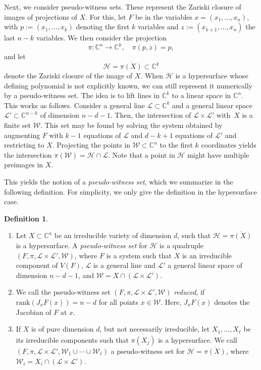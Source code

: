 \documentclass[11pt]{article}
\numberwithin{equation}{section}
\theoremstyle{plain}
\theoremstyle{definition}
\newtheorem{definition}[theorem]{Definition}
\theoremstyle{remark}
\newcommand{\sH}{{\mathcal H}}
\newcommand\bC{{\mathbb C}}
\begin{document}
Next, we consider pseudo-witness sets. These represent the Zariski closure of images of projections of $X$. For this, let $F$ be in the variables $x=(x_{1},\dots, x_{n})$, with $p:=(x_{1},\dots, x_{k})$ denoting the first $k$ variables and $z:=(x_{k+1},\ldots,x_n)$ the last $n-k$ variables. We then consider the projection
\begin{equation}\label{projection}
    \pi \colon \bC^{n} \to \bC^{k}, \quad \pi(p,z) = p,
\end{equation}
and let 
\begin{equation}\label{def_H_formal}\sH = \overline{\pi(X)}\subset \bC^{k}\end{equation}
denote the Zariski closure of the image of $X$. 
When $\sH$ is a hypersurface whose defining polynomial is not explicitly known, we can still represent it numerically by a pseudo-witness set. The idea is to lift lines in $\mathbb C^k$ to a linear space in $\mathbb C^n$. This works as follows. Consider a general line $\mathcal{L}\subset \bC^{k}$ and a general linear space $\mathcal{L}' \subset \bC^{n-k}$ of dimension $n-d-1$. Then, the intersection of $\mathcal{L}\times \mathcal{L}'$ with~$X$ is a finite set $\mathcal{W}$. This set may be found by solving the system obtained by augmenting $F$ with $k-1$ equations of $\mathcal{L}$ and $d-k+1$ equations of $\mathcal{L}'$ and restricting to $X$. Projecting the points in $\mathcal{W} \subset \bC^{n}$ to the first $k$ coordinates yields the intersection $\pi(\mathcal W)=\sH\cap \mathcal L$. Note that a point in $\sH$ might have multiple preimages in $X$. 

This yields the notion of a \emph{pseudo-witness set}, which we summarize in the following definition. 
For simplicity, we only give the definition in the hypersurface case.

\begin{definition}\label{def:PWS}
\begin{enumerate}\item 
Let $X\subset \bC^n$ be an irreducible variety of dimension $d$, such that $\sH = \overline{\pi(X)}$ is a hypersurface.
A {\em pseudo-witness set}  for $\sH$ is a quadruple $(F,\pi,\mathcal{L}\times \mathcal{L}', \mathcal{W})$, where $F$ is a system such that $X$ is an irreducible component of $V(F)$, $\mathcal L$ is a general line and $\mathcal L'$ a general linear space  of dimension $n-d-1$, and  $\mathcal{W} = X\cap (\mathcal{L}\times \mathcal{L}')$.
\item We call the pseudo-witness set $(F,\pi, \mathcal{L}\times \mathcal{L}', \mathcal{W})$ \emph{reduced}, if $\mathrm{rank}(J_{x}F(x)) = n-d$ for all points $x\in\mathcal W$. Here, $J_{x}F(x)$ denotes the Jacobian of $F$ at $x$. 
\item 
If $X$ is of pure dimension $d$, but not necessarily irreducible, let $X_1,\ldots,X_\ell$ be its irreducible components
such that $\overline{\pi(X_j)}$ is a 
hypersurface.  
We call $(F, \pi, \mathcal{L}\times \mathcal{L}', \mathcal{W}_1\cup\cdots\cup \mathcal W_\ell)$
a pseudo-witness set for $\mathcal H = \overline{\pi(X)}$, where $\mathcal W_i = X_i\cap (\mathcal{L}\times \mathcal{L}')$.
\end{enumerate}
\end{definition}
\end{document}

